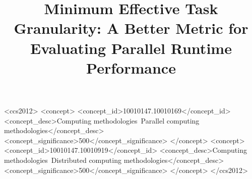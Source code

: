 \documentclass[sigconf,review]{acmart}
\begin{document}
\title{Minimum Effective Task Granularity: A Better Metric for Evaluating Parallel Runtime Performance}




\begin{CCSXML}
<ccs2012>
<concept>
<concept_id>10010147.10010169</concept_id>
<concept_desc>Computing methodologies~Parallel computing methodologies</concept_desc>
<concept_significance>500</concept_significance>
</concept>
<concept>
<concept_id>10010147.10010919</concept_id>
<concept_desc>Computing methodologies~Distributed computing methodologies</concept_desc>
<concept_significance>500</concept_significance>
</concept>
</ccs2012>
\end{CCSXML}



\maketitle









\end{document}
